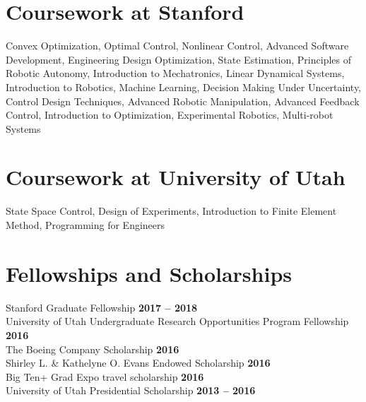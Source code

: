 \documentclass[margin,line]{res}
\begin{document}
\begin{resume}
\section{\sc Coursework at Stanford}
Convex Optimization, Optimal Control, Nonlinear Control, Advanced Software Development, Engineering Design Optimization, State Estimation, Principles of Robotic Autonomy, Introduction to Mechatronics, Linear Dynamical Systems, Introduction to Robotics, Machine Learning, Decision Making Under Uncertainty, Control Design Techniques, Advanced Robotic Manipulation, Advanced Feedback Control, Introduction to Optimization, Experimental Robotics, Multi-robot Systems
\\
\section{\sc Coursework at University of Utah}
State Space Control, Design of Experiments, Introduction to Finite Element Method, Programming for Engineers
\\

\section{\sc Fellowships and Scholarships}
Stanford Graduate Fellowship \hfill {\bf 2017 – 2018}\\
University of Utah Undergraduate Research Opportunities Program Fellowship \hfill {\bf 2016}\\
The Boeing Company Scholarship \hfill {\bf 2016}\\
Shirley L. \& Kathelyne O. Evans Endowed Scholarship \hfill {\bf 2016}\\
Big Ten+ Grad Expo travel scholarship \hfill {\bf 2016}\\
University of Utah Presidential Scholarship \hfill {\bf 2013 – 2016}
\\

\end{resume}
\end{document}
